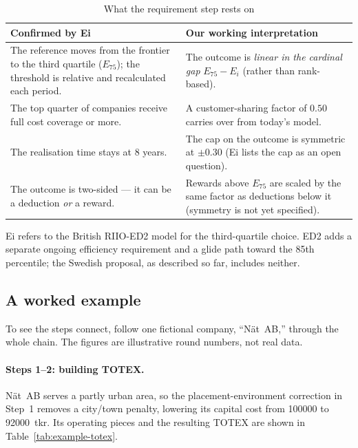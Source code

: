 \begin{table}[H]
\centering
\footnotesize
\begin{threeparttable}
\caption{What the requirement step rests on}
\label{tab:confirmed}
\begin{tabular}{@{}p{7.3cm}p{7.3cm}@{}}
\toprule
\textbf{Confirmed by Ei} & \textbf{Our working interpretation} \\
\midrule
The reference moves from the frontier to the third quartile ($E_{75}$); the
threshold is relative and recalculated each period.
& The outcome is \emph{linear in the cardinal gap} $E_{75}-E_i$ (rather than
rank-based). \\[4pt]
The top quarter of companies receive full cost coverage or more.
& A customer-sharing factor of $0.50$ carries over from today's model. \\[4pt]
The realisation time stays at 8 years.
& The cap on the outcome is symmetric at $\pm 0.30$ (Ei lists the cap as an open
question). \\[4pt]
The outcome is two-sided --- it can be a deduction \emph{or} a reward.
& Rewards above $E_{75}$ are scaled by the same factor as deductions below it
(symmetry is not yet specified). \\
\bottomrule
\end{tabular}
\begin{tablenotes}
\item Ei refers to the British RIIO-ED2 model for the third-quartile choice. ED2
adds a separate ongoing efficiency requirement and a glide path toward the 85th
percentile; the Swedish proposal, as described so far, includes neither.
\end{tablenotes}
\end{threeparttable}
\end{table}


\subsection{A worked example}
\label{sec:example}

To see the steps connect, follow one fictional company, ``Nät~AB,'' through the
whole chain. The figures are illustrative round numbers, not real data.

\paragraph{Steps 1--2: building TOTEX.}
Nät~AB serves a partly urban area, so the placement-environment correction in
Step~1 removes a city/town penalty, lowering its capital cost from
\SI{100000}{} to \SI{92000}{tkr}. Its operating pieces and the resulting TOTEX
are shown in Table~\ref{tab:example-totex}.

